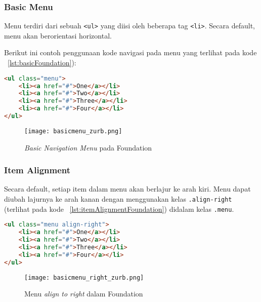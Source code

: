 \subsubsection{Basic Menu}
Menu terdiri dari sebuah \texttt{<ul>} yang diisi oleh beberapa tag \texttt{<li>}. Secara default, menu akan berorientasi horizontal.

Berikut ini contoh penggunaan kode navigasi pada menu yang terlihat pada kode ~\ref{lst:basicFoundation}):

\begin{lstlisting}[style=customhtml, language=HTML,  basicstyle=\ttfamily, frame=single, columns=fullflexible, keepspaces=true, breaklines=true, showstringspaces=false, label={lst:basicFoundation}, caption=Basic Menu Foundation 6.] 
<ul class="menu">
	<li><a href="#">One</a></li>
	<li><a href="#">Two</a></li>
	<li><a href="#">Three</a></li>
	<li><a href="#">Four</a></li>
</ul>
\end{lstlisting}

\begin{figure} [H]  
	\centering  
	\texttt{[image: basicmenu\_zurb.png]}  
	\caption{\textit{Basic Navigation Menu} pada Foundation}
	\label{fig:navFoundation}
\end{figure}

\subsubsection{Item Alignment}
Secara default, setiap item dalam menu akan berlajur ke arah kiri. Menu dapat diubah lajurnya ke arah kanan dengan menggunakan kelas \texttt{.align-right} (terlihat pada kode ~\ref{lst:itemAlignmentFoundation}) didalam kelas \texttt{.menu}.
\begin{lstlisting}[style=customhtml, language=HTML,  basicstyle=\ttfamily, frame=single, columns=fullflexible, keepspaces=true, breaklines=true, showstringspaces=false, label={lst:itemAlignmentFoundation}, caption=Item Alignment Foundation 6.] 
<ul class="menu align-right">
	<li><a href="#">One</a></li>
	<li><a href="#">Two</a></li>
	<li><a href="#">Three</a></li>
	<li><a href="#">Four</a></li>
</ul>
\end{lstlisting}

\begin{figure}[H]
	\centering  
	\texttt{[image: basicmenu\_right\_zurb.png]}  
	\caption{Menu \textit{align to right} dalam Foundation}
	\label{fig:alignRightFoundation}
\end{figure}


